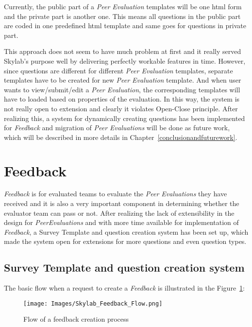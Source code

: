 Currently, the public part of a \textit{Peer Evaluation} templates will be one html form and the private part is another one. This means all questions in the public part are coded in one predefined html template and same goes for questions in private part.

This approach does not seem to have much problem at first and it really served Skylab's purpose well by delivering perfectly workable features in time. However, since questions are different for different \textit{Peer Evaluation} templates, separate templates have to be created for new \textit{Peer Evaluation} template. And when user wants to view/submit/edit a \textit{Peer Evaluation}, the corresponding templates will have to loaded based on properties of the evaluation. In this way, the system is not really open to extension and clearly it violates Open-Close principle. After realizing this, a system for dynamically creating questions has been implemented for \textit{Feedback} and migration of \textit{Peer Evaluations} will be done as future work, which will be described in more details in Chapter~\ref{conclusionandfuturework}.

\section{Feedback} \label{feedback}

\textit{Feedback} is for evaluated teams to evaluate the \textit{Peer Evaluations} they have received and it is also a very important component in determining whether the evaluator team can pass or not. After realizing the lack of extensibility in the design for \textit{PeerEvaluations} and with more time available for implementation of \textit{Feedback}, a Survey Template and question creation system has been set up, which made the system open for extensions for more questions and even question types.

\subsection{Survey Template and question creation system}

The basic flow when a request to create a \textit{Feedback} is illustrated in the Figure~\ref{fig:FeedbackFlow}:

\begin{figure}[h]
  \centering
  \texttt{[image: Images/Skylab\_Feedback\_Flow.png]}
  \caption{Flow of a feedback creation process}
  \label{fig:FeedbackFlow}
\end{figure}

